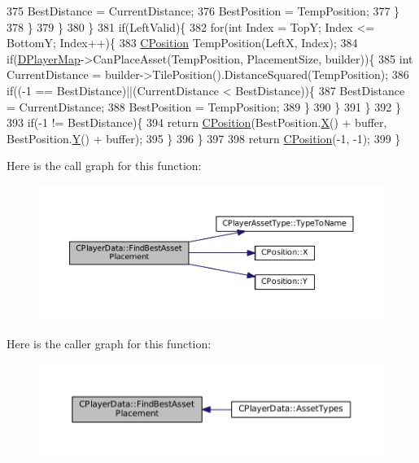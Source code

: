 \begin{DoxyCode}
375                         BestDistance = CurrentDistance;
376                         BestPosition = TempPosition;
377                     \}
378                 \}
379             \}
380         \}
381         \textcolor{keywordflow}{if}(LeftValid)\{
382            \textcolor{keywordflow}{for}(\textcolor{keywordtype}{int} Index = TopY; Index <= BottomY; Index++)\{
383                 \hyperlink{classCPosition}{CPosition} TempPosition(LeftX, Index);
384                 \textcolor{keywordflow}{if}(\hyperlink{classCPlayerData_a452163191cd4603e1e38dd8d4bb9691c}{DPlayerMap}->CanPlaceAsset(TempPosition, PlacementSize, builder))\{
385                     \textcolor{keywordtype}{int} CurrentDistance = builder->TilePosition().DistanceSquared(TempPosition);
386                     \textcolor{keywordflow}{if}((-1 == BestDistance)||(CurrentDistance < BestDistance))\{
387                         BestDistance = CurrentDistance;
388                         BestPosition = TempPosition;
389                     \}
390                 \}
391             \}
392         \}
393         \textcolor{keywordflow}{if}(-1 != BestDistance)\{
394             \textcolor{keywordflow}{return} \hyperlink{classCPosition}{CPosition}(BestPosition.\hyperlink{classCPosition_a9a6b94d3b91df1492d166d9964c865fc}{X}() + buffer, BestPosition.\hyperlink{classCPosition_a1aa8a30e2f08dda1f797736ba8c13a87}{Y}() + buffer); 
395         \}
396     \}
397     
398     \textcolor{keywordflow}{return} \hyperlink{classCPosition}{CPosition}(-1, -1);
399 \}
\end{DoxyCode}
Here is the call graph for this function\+:\nopagebreak
\begin{figure}[H]
\begin{center}
\leavevmode
\includegraphics[width=350pt]{classCPlayerData_ac43ee660aa07b2d9d96eb5285d50fab5_cgraph}
\end{center}
\end{figure}
Here is the caller graph for this function\+:\nopagebreak
\begin{figure}[H]
\begin{center}
\leavevmode
\includegraphics[width=350pt]{classCPlayerData_ac43ee660aa07b2d9d96eb5285d50fab5_icgraph}
\end{center}
\end{figure}

